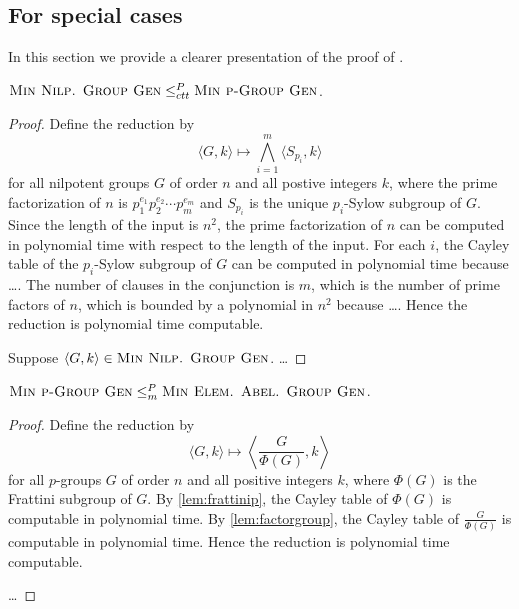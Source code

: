 \documentclass{article}
\begin{document}
\subsection{For special cases}

In this section we provide a clearer presentation of the proof of \cite[Theorem~7]{at06}.

\begin{proposition}
  $\textsc{Min Nilp. Group Gen} \leq_{ctt}^P \textsc{Min p-Group Gen}$.
\end{proposition}
\begin{proof}
  Define the reduction by
  \begin{equation*}
    \langle G, k \rangle \mapsto \bigwedge_{i=1}^m \langle S_{p_i}, k \rangle
  \end{equation*}
  for all nilpotent groups $G$ of order $n$ and all postive integers $k$, where the prime factorization of $n$ is $p_1^{e_1}p_2^{e_2}\dotsb p_m^{e_m}$ and $S_{p_i}$ is the unique $p_i$-Sylow subgroup of $G$.
  Since the length of the input is $n^2$, the prime factorization of $n$ can be computed in polynomial time with respect to the length of the input.
  For each $i$, the Cayley table of the $p_i$-Sylow subgroup of $G$ can be computed in polynomial time because \ldots.
  The number of clauses in the conjunction is $m$, which is the number of prime factors of $n$, which is bounded by a polynomial in $n^2$ because \ldots.
  Hence the reduction is polynomial time computable.

  Suppose $\langle G, k \rangle \in \textsc{Min Nilp. Group Gen}$.
  \ldots
\end{proof}

\begin{proposition}
  $\textsc{Min p-Group Gen} \leq_m^P \textsc{Min Elem. Abel. Group Gen}$.
\end{proposition}
\begin{proof}
  Define the reduction by
  \begin{equation*}
    \langle G, k \rangle \mapsto \left\langle \frac{G}{\Phi(G)}, k \right\rangle
  \end{equation*}
  for all $p$-groups $G$ of order $n$ and all positive integers $k$, where $\Phi(G)$ is the Frattini subgroup of $G$.
  By \autoref{lem:frattinip}, the Cayley table of $\Phi(G)$ is computable in polynomial time.
  By \autoref{lem:factorgroup}, the Cayley table of $\frac{G}{\Phi(G)}$ is computable in polynomial time.
  Hence the reduction is polynomial time computable.

  \ldots
\end{proof}
\end{document}
